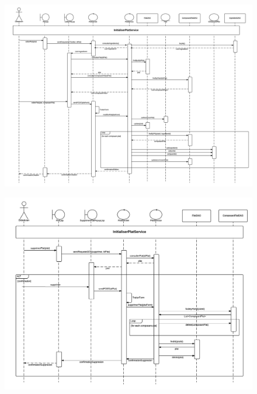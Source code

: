 \documentclass{beamer}
\begin{document}
\begin{frame}[plain]{}
\begin{figure}
\centering
\includegraphics[scale=0.275]{../CasDUtilisations/CompositionPlat/sequence_EditerPlat.png}
\end{figure}
\end{frame}

\begin{frame}[plain]{}
\begin{figure}
\centering
\includegraphics[scale=0.325]{../../CasDUtilisations/CompositionPlat/sequence_SupprimerPlat.png}
\end{figure}
\end{frame}
\end{document}
